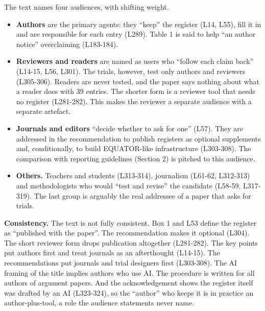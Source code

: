 {The text names four audiences, with shifting weight.

\begin{itemize}
\tightlist
\item
  \textbf{Authors} are the primary agents: they ``keep'' the register
  (L14, L55), fill it in and are responsible for each entry (L289).
  Table 1 is said to help ``an author notice'' overclaiming (L183-184).
\item
  \textbf{Reviewers and readers} are named as users who ``follow each
  claim back'' (L14-15, L56, L301). The trials, however, test only
  authors and reviewers (L305-306). Readers are never tested, and the
  paper says nothing about what a reader does with 39 entries. The
  shorter form is a reviewer tool that needs no register (L281-282).
  This makes the reviewer a separate audience with a separate artefact.
\item
  \textbf{Journals and editors} ``decide whether to ask for one'' (L57).
  They are addressed in the recommendation to publish registers as
  optional supplements and, conditionally, to build EQUATOR-like
  infrastructure (L303-308). The comparison with reporting guidelines
  (Section 2) is pitched to this audience.
\item
  \textbf{Others.} Teachers and students (L313-314), journalism (L61-62,
  L312-313) and methodologists who would ``test and revise'' the
  candidate (L58-59, L317-319). The last group is arguably the real
  addressee of a paper that asks for trials.
\end{itemize}

\textbf{Consistency.} The text is not fully consistent. Box 1 and L53
define the register as ``published with the paper''. The recommendation
makes it optional (L304). The short reviewer form drops publication
altogether (L281-282). The key points put authors first and treat
journals as an afterthought (L14-15). The recommendations put journals
and trial designers first (L303-308). The AI framing of the title
implies authors who use AI. The procedure is written for all authors of
argument papers. And the acknowledgement shows the register itself was
drafted by an AI (L323-324), so the ``author'' who keeps it is in
practice an author-plus-tool, a role the audience statements never name.
}
